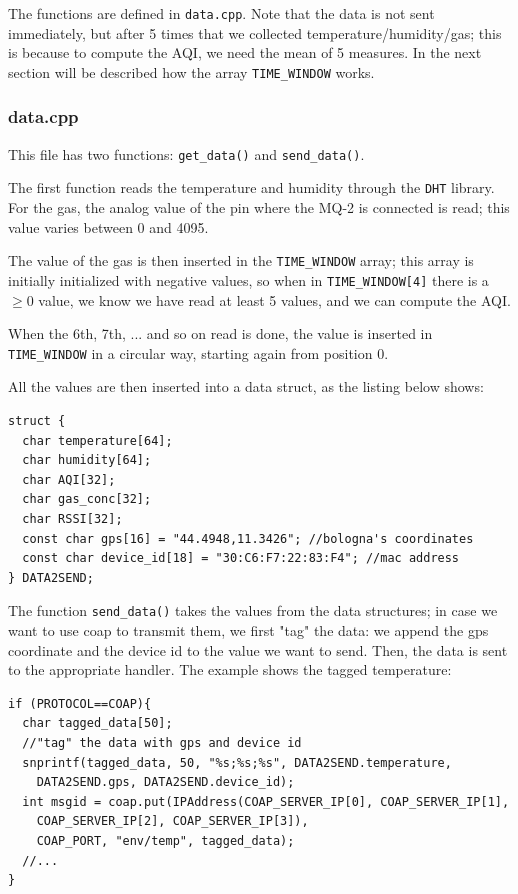 \documentclass[]{article}
\begin{document}
The functions are defined in \texttt{data.cpp}. Note that the data is not sent immediately, but after 5 times that we collected temperature/humidity/gas; this is because to compute the AQI, we need the mean of 5 measures. In the next section will be described how the array \texttt{TIME\_WINDOW} works.

\subsubsection{data.cpp}
This file has two functions: \texttt{get\_data()} and \texttt{send\_data()}.

The first function reads the temperature and humidity through the \texttt{DHT} library. For the gas, the analog value of the pin where the MQ-2 is connected is read; this value varies between 0 and 4095. \cite{tut:read}

The value of the gas is then inserted in the \texttt{TIME\_WINDOW} array; this array is initially initialized with negative values, so when in \texttt{TIME\_WINDOW[4]} there is a $ \ge 0 $ value, we know we have read at least 5 values, and we can compute the AQI.

When the 6th, 7th, ... and so on read is done, the value is inserted in \texttt{TIME\_WINDOW} in a circular way, starting again from position 0.

All the values are then inserted into a data struct, as the listing below shows:

\begin{lstlisting}[style=C++, caption=Loop function]
struct {
  char temperature[64];
  char humidity[64];
  char AQI[32];
  char gas_conc[32];
  char RSSI[32];
  const char gps[16] = "44.4948,11.3426"; //bologna's coordinates
  const char device_id[18] = "30:C6:F7:22:83:F4"; //mac address
} DATA2SEND;	
\end{lstlisting}

The function \texttt{send\_data()} takes the values from the data structures; in case we want to use coap to transmit them, we first "tag" the data: we append the gps coordinate and the device id to the value we want to send. Then, the data is sent to the appropriate handler.
The example shows the tagged temperature:

\begin{lstlisting}[style=C++, caption=Example of tagged  data (temperature) - coap protocol]
if (PROTOCOL==COAP){
  char tagged_data[50];
  //"tag" the data with gps and device id
  snprintf(tagged_data, 50, "%s;%s;%s", DATA2SEND.temperature, 
    DATA2SEND.gps, DATA2SEND.device_id);
  int msgid = coap.put(IPAddress(COAP_SERVER_IP[0], COAP_SERVER_IP[1], 
    COAP_SERVER_IP[2], COAP_SERVER_IP[3]),
    COAP_PORT, "env/temp", tagged_data);
  //...
}
\end{lstlisting}
\end{document}
